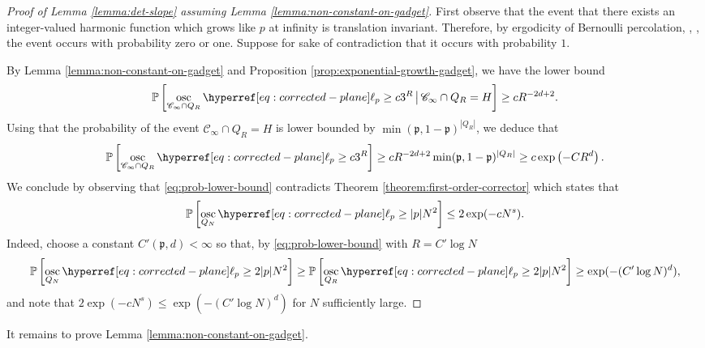 \documentclass[12pt]{amsart}
\numberwithin{equation}{section}
\begin{document}
	
	\begin{proof}[Proof of Lemma \ref{lemma:det-slope} assuming Lemma \ref{lemma:non-constant-on-gadget}]
		
		First observe that the event that there exists an integer-valued harmonic function which grows like $p$ at infinity is translation invariant. Therefore, by ergodicity of Bernoulli percolation, \eg, \cite[Proposition 7.3]{lyons-peres-book}, the event occurs with probability zero or one. Suppose for sake of contradiction that it occurs with probability $1$.
		
		
		By Lemma \ref{lemma:non-constant-on-gadget} and Proposition \ref{prop:exponential-growth-gadget}, we have the lower bound
		\begin{equation*}
			\P \left[ \osc_{\mathscr{C}_\infty \cap Q_R}  \ellp{p}  \geq c 3^{R} \, \big| \, \mathscr{C}_\infty \cap Q_R = H \right] \geq c R^{-2d+2}.
		\end{equation*}
		Using that the probability of the event $\mathscr{C}_\infty \cap Q_R = H$ is lower bounded by $\min( \mathfrak{p}, 1 - \mathfrak{p})^{\left| Q_R \right|}$, we deduce that
		\begin{equation} \label{eq:prob-lower-bound}
			\P \left[ \osc_{\mathscr{C}_\infty \cap Q_R} \ellp{p}  \geq c 3^{R}  \right] \geq c R^{-2d+2} \min( \mathfrak{p}, 1 - \mathfrak{p})^{\left|Q_R\right|}  \geq c \exp \left( - C R^d \right).
		\end{equation}
		We conclude by observing that \eqref{eq:prob-lower-bound} contradicts Theorem \ref{theorem:first-order-corrector} which states that 
		\[
		\P \left[ \osc_{Q_N} \ellp{p} \geq |p| N^{2} \right] \leq 2 \exp(-c N^s).
		\] 
		Indeed, choose a constant $C'(\mathfrak{p},d) < \infty$ so that, by \eqref{eq:prob-lower-bound} with $R = C' \log N$
		\[
		\P \left[ \osc_{Q_N} \ellp{p}   \geq 2 |p| N^{2} \right] \geq 	\P\left[\osc_{Q_R} \ellp{p}  \geq 2 |p| N^{2} \right] \geq  \exp( - (C' \log N)^d),
		\]	
		and note that $2 \exp(-c N^s) \leq \exp( - (C' \log N)^d)$ for $N$ sufficiently large.
	\end{proof}
	
	
	
	It remains to prove Lemma \ref{lemma:non-constant-on-gadget}.
	
	
	
\end{document}
